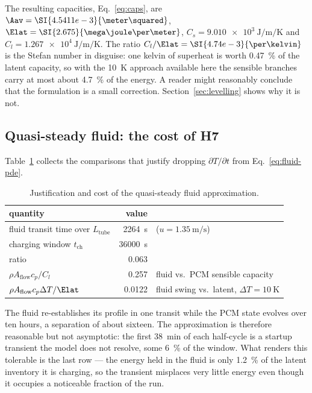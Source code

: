 \noindent
The resulting capacities, Eq.~\eqref{eq:caps}, are
$\Aav=\SI{4.5411e-3}{\meter\squared}$,
$\Elat=\SI{2.675}{\mega\joule\per\meter}$,
$C_{s}=\SI{9.010e3}{\joule\per\meter\per\kelvin}$ and
$C_{l}=\SI{1.267e4}{\joule\per\meter\per\kelvin}$. The ratio
$C_{l}/\Elat=\SI{4.74e-3}{\per\kelvin}$ is the Stefan number in disguise: one
kelvin of superheat is worth \SI{0.47}{\percent} of the latent capacity, so with
the \SI{10}{\kelvin} approach available here the sensible branches carry at most
about \SI{4.7}{\percent} of the energy. A reader might reasonably conclude that
the formulation is a small correction. Section~\ref{sec:levelling} shows why it
is not.

\subsection{Quasi-steady fluid: the cost of H7}

Table~\ref{tab:h7} collects the comparisons that justify dropping
$\partial T/\partial t$ from Eq.~\eqref{eq:fluid-pde}.

\begin{table}[htbp]
\centering
\caption{Justification and cost of the quasi-steady fluid approximation.}
\label{tab:h7}
\begin{tabular}{@{}l r l@{}}
\toprule
quantity & value & \\
\midrule
fluid transit time over $L_{\mathrm{tube}}$ & \SI{2264}{\second}
  & ($u=\SI{1.35}{\meter\per\second}$) \\
charging window $t_{\mathrm{ch}}$ & \SI{36000}{\second} & \\
ratio & \num{0.063} & \\
$\rho A_{\mathrm{flow}}c_{p}/C_{l}$ & \num{0.257}
  & fluid vs.\ PCM sensible capacity \\
$\rho A_{\mathrm{flow}}c_{p}\Delta T/\Elat$ & \num{0.0122}
  & fluid swing vs.\ latent, $\Delta T=\SI{10}{\kelvin}$ \\
\bottomrule
\end{tabular}
\end{table}

\noindent
The fluid re-establishes its profile in one transit while the PCM state evolves
over ten hours, a separation of about sixteen. The approximation is therefore
reasonable but not asymptotic: the first \SI{38}{\minute} of each half-cycle is
a startup transient the model does not resolve, some \SI{6}{\percent} of the
window. What renders this tolerable is the last row --- the energy held in the
fluid is only \SI{1.2}{\percent} of the latent inventory it is charging, so the
transient misplaces very little energy even though it occupies a noticeable
fraction of the run.


